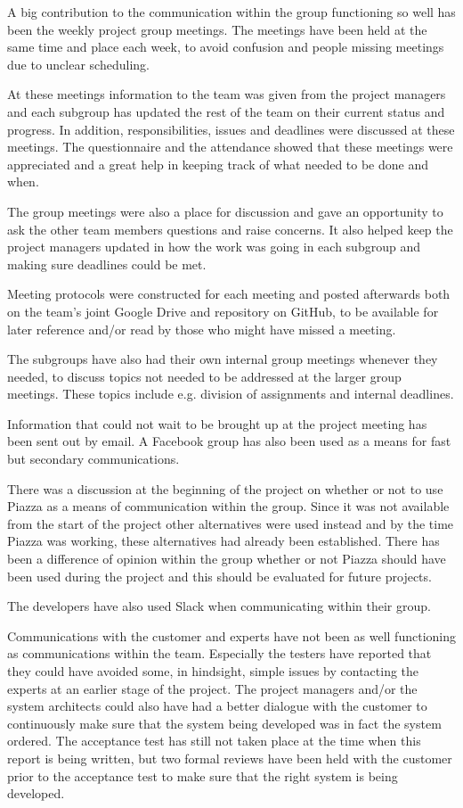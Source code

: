 \documentclass[a4paper]{article}
\begin{document}
A big contribution to the communication within the group functioning so well has been the weekly project group meetings. The meetings have been held at the same time and place each week, to avoid confusion and people missing meetings due to unclear scheduling. 

At these meetings information to the team was given from the project managers and each subgroup has updated the rest of the team on their current status and progress. In addition, responsibilities, issues and deadlines were discussed at these meetings. The questionnaire and the attendance showed that these meetings were appreciated and a great help in keeping track of what needed to be done and when. 

The group meetings were also a place for discussion and gave an opportunity to ask the other team members questions and raise concerns. It also helped keep the project managers updated in how the work was going in each subgroup and making sure deadlines could be met.

Meeting protocols were constructed for each meeting and posted afterwards both on the team's joint Google Drive and repository on GitHub, to be available for later reference and/or read by those who might have missed a meeting.

The subgroups have also had their own internal group meetings whenever they needed, to discuss topics not needed to be addressed at the larger group meetings. These topics include e.g. division of assignments and internal deadlines.

Information that could not wait to be brought up at the project meeting has been sent out by email. A Facebook group has also been used as a means for fast but secondary communications.

There was a discussion at the beginning of the project on whether or not to use Piazza as a means of communication within the group. Since it was not available from the start of the project other alternatives were used instead and by the time Piazza was working, these alternatives had already been established. There has been a difference of opinion within the group whether or not Piazza should have been used during the project and this should be evaluated for future projects.

The developers have also used Slack when communicating within their group.

Communications with the customer and experts have not been as well functioning as communications within the team. Especially the testers have reported that they could have avoided some, in hindsight, simple issues by contacting the experts at an earlier stage of the project. The project managers and/or the system architects could also have had a better dialogue with the customer to continuously make sure that the system being developed was in fact the system ordered. The acceptance test has still not taken place at the time when this report is being written, but two formal reviews have been held with the customer prior to the acceptance test to make sure that the right system is being developed.
\end{document}
